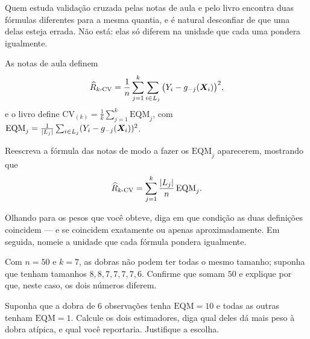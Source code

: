 Quem estuda validação cruzada pelas notas de aula e pelo livro encontra duas fórmulas
diferentes para a mesma quantia, e é natural desconfiar de que uma delas esteja
errada. Não está: elas só diferem na unidade que cada uma pondera igualmente.

As notas de aula definem
\[
  \widehat{R}_{k\text{-CV}}
   = \frac1n\sum_{j=1}^{k}\sum_{i\in L_j}\big(Y_i-g_{-j}(\bm{X}_i)\big)^2 ,
\]
e o livro define $\mathrm{CV}_{(k)}=\frac1k\sum_{j=1}^{k}\mathrm{EQM}_j$, com
$\mathrm{EQM}_j=\frac{1}{\left\lvert L_j \right\rvert}\sum_{i\in L_j}(Y_i-g_{-j}(\bm{X}_i))^2$.
\begin{itens}
  \item {} Reescreva a fórmula das notas de modo a fazer os
        $\mathrm{EQM}_j$ aparecerem, mostrando que
        \[
          \widehat{R}_{k\text{-CV}}=\sum_{j=1}^{k}\frac{\left\lvert L_j \right\rvert}{n}\,\mathrm{EQM}_j .
        \]
  \item {} Olhando para os pesos que você obteve, diga em que condição as
        duas definições coincidem --- e se coincidem exatamente ou apenas
        aproximadamente. Em seguida, nomeie a unidade que cada fórmula pondera
        igualmente.
  \item {} Com $n=50$ e $k=7$, as dobras não podem ter todas o mesmo
        tamanho; suponha que tenham tamanhos $8,8,7,7,7,7,6$. Confirme que somam $50$
        e explique por que, neste caso, os dois números diferem.
  \item {} Suponha que a dobra de $6$ observações tenha $\mathrm{EQM}=10$ e
        todas as outras tenham $\mathrm{EQM}=1$. Calcule os dois estimadores, diga
        qual deles dá mais peso à dobra atípica, e qual você reportaria. Justifique
        a escolha.
\end{itens}

